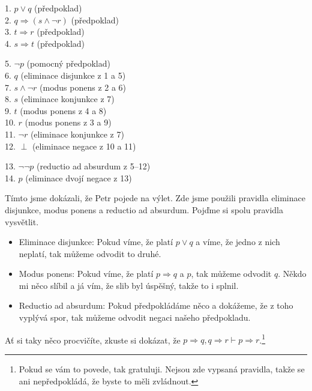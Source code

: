 \begin{example}
  \begin{proofbox}
    1. $p \lor q$ (předpoklad) \\
    2. $q \Rightarrow (s \land \neg r)$ (předpoklad) \\
    3. $t \Rightarrow r$ (předpoklad) \\
    4. $s \Rightarrow t$ (předpoklad) 
  \begin{proofbox}
    5. $\neg p$ (pomocný předpoklad) \\
    6. $q$ (eliminace disjunkce z 1 a 5) \\
    7. $s \land \neg r$ (modus ponens z 2 a 6) \\
    8. $s$ (eliminace konjunkce z 7) \\
    9. $t$ (modus ponens z 4 a 8) \\
    10. $r$ (modus ponens z 3 a 9) \\
    11. $\neg r$ (eliminace konjunkce z 7) \\
    12. $\perp$ (eliminace negace z 10 a 11)
  \end{proofbox}
    13. $\lnot\lnot p$ (reductio ad absurdum z 5--12) \\
    14. $p$ (eliminace dvojí negace z 13)
  \end{proofbox}
  Tímto jsme dokázali, že Petr pojede na výlet. Zde jsme použili pravidla eliminace disjunkce, modus ponens a reductio ad absurdum. Pojďme si spolu pravidla vysvětlit. 
  \begin{itemize}
    \item Eliminace disjunkce: Pokud víme, že platí $p \lor q$ a víme, že jedno z nich neplatí, tak můžeme odvodit to druhé. 
    \item Modus ponens: Pokud víme, že platí $p \Rightarrow q$ a $p$, tak můžeme odvodit $q$. Někdo mi něco slíbil a já vím, že slib byl úspěšný, takže to i splnil.
    \item Reductio ad absurdum: Pokud předpokládáme něco a dokážeme, že z toho vyplývá spor, tak můžeme odvodit negaci našeho předpokladu.
  \end{itemize}
\end{example}

\begin{problem}
  Ať si taky něco procvičíte, zkuste si dokázat, že $p \Rightarrow q, q \Rightarrow r \vdash p \Rightarrow r$.\footnote{Pokud se vám to povede, tak gratuluji. Nejsou zde vypsaná pravidla, takže se ani nepředpokládá, že byste to měli zvládnout.}
\end{problem}

